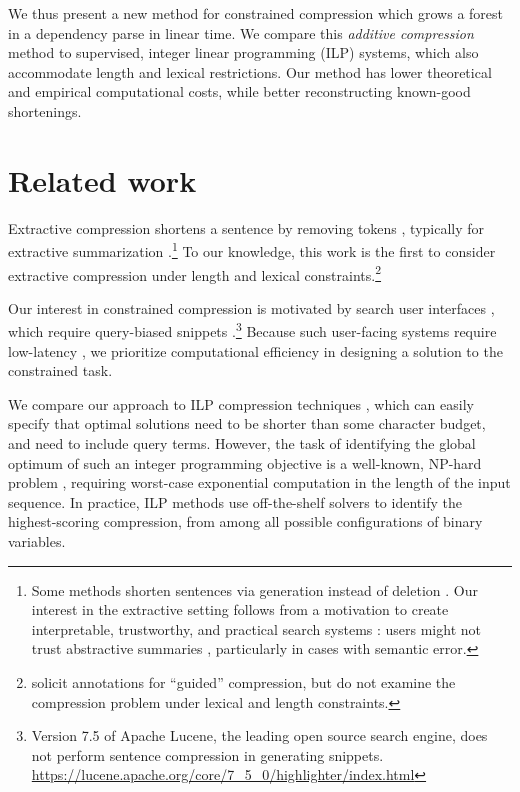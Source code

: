 \documentclass[11pt,a4paper]{article}
\begin{document}
We thus present a new method for constrained compression which grows a forest in a dependency parse in linear time. We compare this \textit{additive compression} method to supervised, integer linear programming (ILP) systems, which also accommodate length and lexical restrictions. Our method has lower theoretical and empirical computational costs, while better reconstructing known-good shortenings. 

\section{Related work}\label{s:relatedwork}

Extractive compression shortens a sentence by removing tokens \cite{Knight2000StatisticsBasedS,clarke2008global,filippova2015sentence,Wang2017CanSH}, typically for extractive summarization \cite{Knight2000StatisticsBasedS,almeida2013fast,P16-1188}.\footnote{Some methods shorten sentences via generation instead of deletion \cite{rush2015neural,mallinson18}. Our interest in the extractive setting follows from a motivation to create interpretable,  trustworthy, and practical search systems \cite{Chuang2012InterpretationAT}: users might not trust abstractive summaries \cite{Zhang:2018:MSG:3290265.3274465}, particularly in cases with semantic error.} To our knowledge, this work is the first to consider extractive compression under length and lexical constraints.\footnote{\citet{Li2013DocumentSV} solicit annotations for ``guided'' compression, but do not examine the compression problem under lexical and length constraints.}

Our interest in constrained compression is motivated by search user interfaces \cite{hearst2009search}, which require query-biased snippets \cite{tombros1998advantages}.\footnote{Version 7.5 of Apache Lucene, the leading open source search engine, does not perform sentence compression in generating snippets. \url{https://lucene.apache.org/core/7_5_0/highlighter/index.html}} Because such user-facing systems require low-latency \cite{Nielsen,heerschei,Liu2014TheEO}, we prioritize computational efficiency in designing a solution to the constrained task. 

We compare our approach to ILP compression techniques \cite{clarke2008global,filippova2008dependency,filippova2013overcoming,Wang2017CanSH}, which can easily specify that optimal solutions need to be shorter than some character budget, and need to include query terms. However, the task of identifying the global optimum of such an integer programming objective is a well-known, NP-hard problem \cite{clarke2008global}, requiring worst-case exponential computation in the length of the input sequence. In practice, ILP methods use off-the-shelf solvers to identify the highest-scoring compression, from among all possible configurations of binary variables. 
\end{document}
